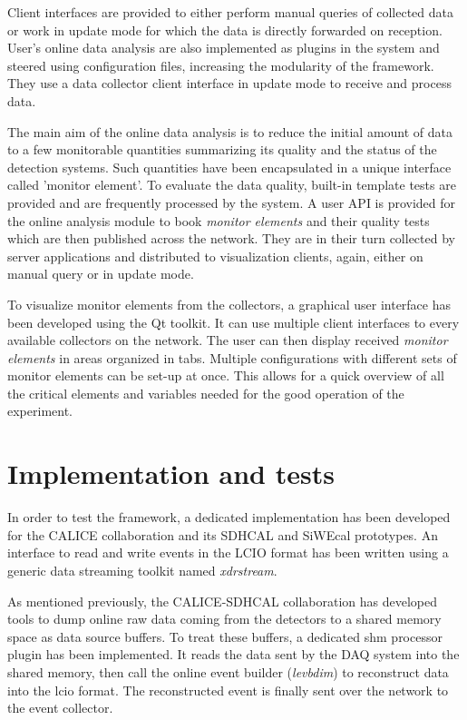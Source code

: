 \documentclass[conference]{IEEEtran}
\begin{document}
Client interfaces are provided to either perform manual queries of collected data or work in update mode for which the data is directly forwarded on reception. User's online data analysis are also implemented as plugins in the system and steered using configuration files, increasing the modularity of the framework. They use a data collector client interface in update mode to receive and process data.

The main aim of the online data analysis is to reduce the initial amount of data to a few monitorable quantities summarizing its quality and the status of the detection systems. Such quantities have been encapsulated in a unique interface called 'monitor element'. To evaluate the data quality, built-in template tests are provided and are frequently processed by the system. A user API is provided for the online analysis module to book \textit{monitor elements} and their quality tests which are then published across the network. They are in their turn collected by server applications and distributed to visualization clients, again, either on manual query or in update mode.

To visualize monitor elements from the collectors, a graphical user interface has been developed using the Qt\cite{QT} toolkit. It can use multiple client interfaces to every available collectors on the network. The user can then display received \textit{monitor elements} in areas organized in tabs. Multiple configurations with different sets of monitor elements can be set-up at once. This allows for a quick overview of all the critical elements and variables needed for the good operation of the experiment.


\section{Implementation and tests}
In order to test the framework, a dedicated implementation has been developed for the CALICE collaboration and its SDHCAL and SiWEcal prototypes. 
An interface to read and write events in the LCIO format has been written using a generic data streaming toolkit named \textit{xdrstream}.


As mentioned previously, the CALICE-SDHCAL collaboration has developed tools to dump online raw data coming from the detectors to a shared memory space as data source buffers. To treat these buffers, a dedicated shm processor plugin has been implemented. It reads the data sent by the DAQ system into the shared memory, then call the online event builder (\textit{levbdim}) to reconstruct data into the lcio format. The reconstructed event is finally sent over the network to the event collector.
\end{document}
